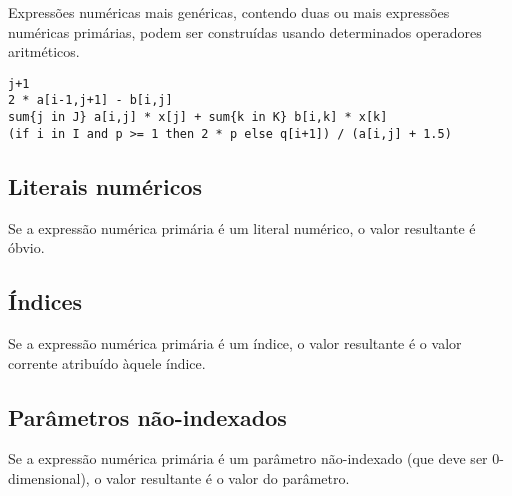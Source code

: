 \documentclass[11pt, brazil]{report}
\def\para#1{\noindent{\bf#1}}
\begin{document}

Expressões numéricas mais genéricas, contendo duas ou mais
expressões numéricas primárias, podem ser construídas usando
determinados operadores aritméticos.


\para{Exemplos}

\begin{verbatim}
j+1
2 * a[i-1,j+1] - b[i,j]
sum{j in J} a[i,j] * x[j] + sum{k in K} b[i,k] * x[k]
(if i in I and p >= 1 then 2 * p else q[i+1]) / (a[i,j] + 1.5)
\end{verbatim}

\subsection{Literais numéricos}

Se a expressão numérica primária é um literal numérico,
o valor resultante é óbvio.


\subsection{Índices}

Se a expressão numérica primária é um índice,
o valor resultante é o valor corrente atribuído àquele índice.


\subsection{Parâmetros não-indexados}

Se a expressão numérica primária é um parâmetro não-indexado
(que deve ser 0-dimensional), o valor resultante é o valor
do parâmetro.
\end{document}
